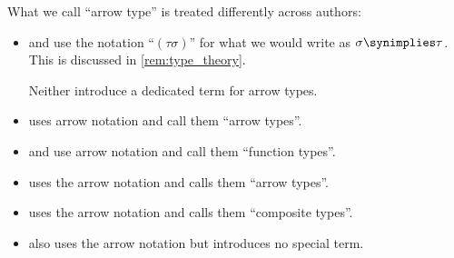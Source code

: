 \begin{remark}\label{rem:arrow_type_name}
  What we call \enquote{arrow type} is treated differently across authors:
  \begin{itemize}
    \item \Textcite[56]{Church1940STT} and \textcite[\S 51]{Andrews2002Logic} use the notation \enquote{\( (\tau\sigma) \)} for what we would write as \( \sigma \synimplies \tau \). This is discussed in \cref{rem:type_theory}.

    Neither introduce a dedicated term for arrow types.

    \item \Textcite[\S 6.2.3]{GirardEtAl1989ProofsAndTypes} uses arrow notation and call them \enquote{arrow types}.

    \item \Textcite[def. 1.2.1]{TroelstraSchwichtenberg2000BasicProofTheory} and \textcite[269]{Farmer2008STTVirtues} use arrow notation and call them \enquote{function types}.

    \item \Textcite[\S 4.1.1]{Mimram2020ProgramEqualsProof} uses the arrow notation and calls them \enquote{arrow types}.

    \item \Textcite[def. 2A1]{Hindley1997BasicSTT} uses the arrow notation and calls them \enquote{composite types}.

    \item \Textcite[def. 3.2.2]{Barendregt1992LambdaCalculiWithTypes} also uses the arrow notation but introduces no special term.
  \end{itemize}
\end{remark}

